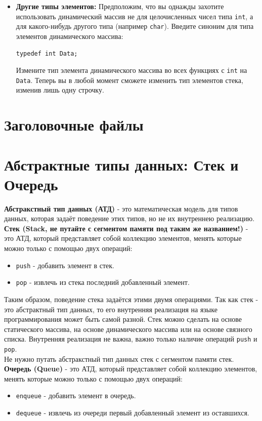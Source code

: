 \documentclass[10pt]{article}
\begin{document}
\begin{itemize}
\item \textbf{Другие типы элементов:} Предположим, что вы однажды захотите использовать динамический массив не для целочисленных чисел типа \texttt{int}, а для какого-нибудь другого типа (например \texttt{char}). Введите синоним для типа элементов динамического массива:
\begin{verbatim}
typedef int Data;
\end{verbatim}
Измените тип элемента динамического массива во всех функциях с \texttt{int} на \texttt{Data}. Теперь вы в любой момент сможете изменить тип элементов стека, изменив лишь одну строчку.
\end{itemize}


\newpage
\section*{Заголовочные файлы}


\newpage
\section*{Абстрактные типы данных: Стек и Очередь}
\textbf{Абстракстный тип данных (АТД)} - это математическая модель для типов данных, которая задаёт поведение этих типов, но не их внутреннею реализацию.\\

\textbf{Стек (Stack, не путайте с сегментом памяти под таким же названием!)} - это АТД, который представляет собой коллекцию элементов, менять которые можно только с помощью двух операций:
\begin{itemize}
\item \texttt{push} - добавить элемент в стек.
\item \texttt{pop} - извлечь из стека последний добавленный элемент.
\end{itemize}
Таким образом, поведение стека задаётся этими двумя операциями. Так как стек - это абстрактный тип данных, то его внутренняя реализация на языке программирования может быть самой разной. Стек можно сделать на основе статического массива, на основе динамического массива или на основе связного списка. Внутренняя реализация не важна, важно только наличие операций \texttt{push} и \texttt{pop}. \\
Не нужно путать абстракстный тип данных стек с сегментом памяти стек.\\

\textbf{Очередь (Queue)} - это АТД, который представляет собой коллекцию элементов, менять которые можно только с помощью двух операций:
\begin{itemize}
\item \texttt{enqueue} - добавить элемент в очередь.
\item \texttt{dequeue} - извлечь из очереди первый добавленный элемент из оставшихся.
\end{itemize}
\end{document}
